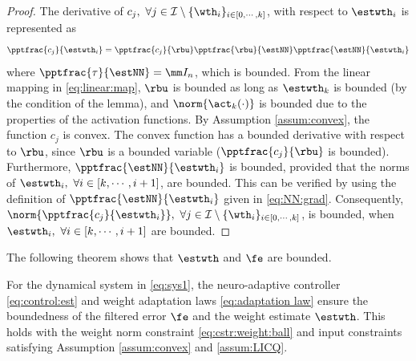 \documentclass[final,5p,times,twocolumn,authoryear]{elsarticle}
\begin{document}
\begin{proof}

The derivative of $c_j,\ \forall j\in\mathcal I \setminus \{\wth_i\}_{i\in[0,\cdots,k]}$, with respect to $\estwth_i$ is represented as
\begin{equation}
    \pptfrac{c_j}{\estwth_i} 
    = 
    \pptfrac{c_j}{\rbu} 
    \pptfrac{\rbu}{\estNN} 
    \pptfrac{\estNN}{\estwth_i}
\end{equation}
where $\pptfrac{\tau}{\estNN}=\mm I_n$, which is bounded. 
From the linear mapping in \eqref{eq:linear:map}, $\rbu$ is bounded as long as $\estwth_k$ is bounded (by the condition of the lemma), and $\norm{\act_k(\cdot)}$ is bounded due to the properties of the activation functions. 
By Assumption \ref{assum:convex}, the function $c_j$ is convex. 
The convex function has a bounded derivative with respect to $\rbu$, since $\rbu$ is a bounded variable (\ie $\pptfrac{c_j}{\rbu}$ is bounded). 
Furthermore, $\pptfrac{\estNN}{\estwth_i}$ is bounded, provided that the norms of $\estwth_i,\ \forall i \in[k,\cdots,i+1]$, are bounded. 
This can be verified by using the definition of $\pptfrac{\estNN}{\estwth_i}$ given in \eqref{eq:NN:grad}.
Consequently, $\norm{\pptfrac{c_j}{\estwth_i}},\ \forall j\in\mathcal I \setminus \{\wth_i\}_{i\in[0,\cdots,k]}$, is bounded, when $\estwth_i,\ \forall i\in [k,\cdots,i+1]$ are bounded.

\end{proof}

The following theorem shows that $\estwth$ and $\fe$ are bounded.

\begin{theorem}
    For the dynamical system in \eqref{eq:sys1}, the neuro-adaptive controller \eqref{eq:control:est} and weight adaptation laws \eqref{eq:adaptation law} ensure the boundedness of the filtered error $\fe$ and the weight estimate $\estwth$. 
    This holds with the weight norm constraint \eqref{eq:cstr:weight:ball} and input constraints satisfying Assumption \ref{assum:convex} and \ref{assum:LICQ}.
\end{theorem}
\end{document}
